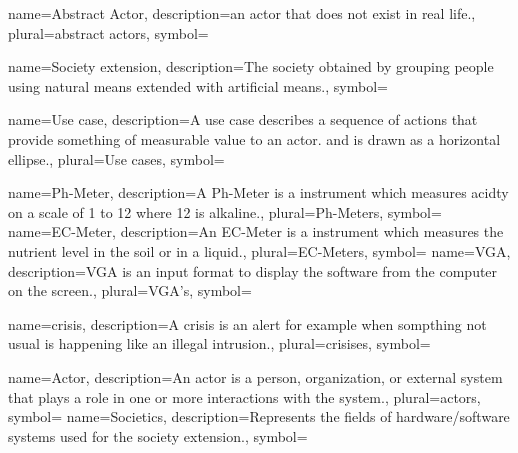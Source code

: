 {name={Abstract Actor},
description={an actor that does not exist in real life.},
plural={abstract actors},
symbol={}
}

{name={Society extension},
description={The society obtained by grouping people using natural means
extended with artificial means.},
symbol={}
}

{name={Use case},
description={A use case describes a sequence of actions that provide something
of measurable value to an actor. and is drawn as a horizontal ellipse.},
plural={Use cases}, 
symbol={} 
}

{name={Ph-Meter},
description={A Ph-Meter is a instrument which measures acidty on a scale of 1
to 12 where 12 is alkaline.}, plural={Ph-Meters},
symbol={}
}
{name={EC-Meter},
description={An EC-Meter is a instrument which measures the nutrient level in
the soil or in a liquid.}, plural={EC-Meters}, symbol={}
}
{name={VGA},
description={VGA is an input format to display the software from the computer
on the screen.}, plural={VGA's}, symbol={} }

{name={crisis},
description={A crisis is an alert for example when sompthing not usual is
happening like an illegal intrusion.}, plural={crisises},
symbol={} }

{name={Actor},
description={An actor is a person, organization, or external system that plays a
role in one or more interactions with the system.},
plural={actors},
symbol={}
}
{name={Societics},
description={Represents the fields of hardware/software
systems used for the society extension.},
symbol={}
}



